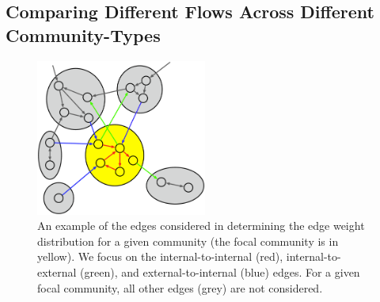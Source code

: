 \subsection{Comparing Different Flows Across Different Community-Types}

\begin{figure}[h!]
  \centering
\includegraphics[width=0.50\textwidth]{figures/edge-types.eps}
\caption{An example of the edges considered in determining the edge weight distribution for a given community (the focal community is in yellow). We focus on the internal-to-internal (red), internal-to-external (green), and external-to-internal (blue) edges. For a given focal community, all other edges (grey) are not considered.}
\label{Fig-edge_types}
\end{figure}